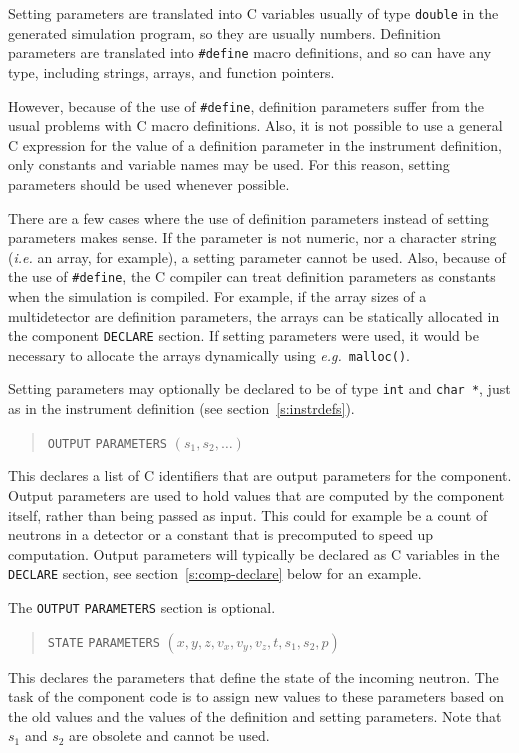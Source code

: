 Setting parameters are translated into C variables usually of type
\verb+double+ in the generated simulation program, so they are usually
numbers. Definition parameters are translated into \verb+#define+ macro
definitions, and so can have any type, including strings, arrays, and
function pointers.

However, because of the use of \verb+#define+, definition parameters
suffer from the usual problems with C macro definitions. Also, it is not
possible to use a general C expression for the value of a definition
parameter in the instrument definition, only constants and variable
names may be used. For this reason, setting parameters should be used
whenever possible.

There are a few cases where the use of definition parameters instead of
setting parameters makes sense. If the parameter is not numeric, nor a character string ({\em i.e.} an
array, for example), a setting parameter cannot be
used. Also, because of the use of \verb+#define+, the C compiler can
treat definition parameters as constants when the simulation is
compiled. For example, if the array sizes of a multidetector are
definition parameters, the arrays can be statically allocated in the
component \verb+DECLARE+ section. If setting parameters were used, it
would be necessary to allocate the arrays dynamically using {\em e.g.}\ 
\verb+malloc()+.

Setting parameters may optionally be declared to be of type \verb+int+ and \verb+char *+, just as in the instrument definition (see section~\ref{s:instrdefs}).

\begin{quote}
  \texttt{OUTPUT} \texttt{PARAMETERS} $(s_1, s_2, \ldots)$
\end{quote}
This declares a list of C identifiers that are output parameters for the
component. Output parameters are used to hold values that are computed
by the component itself, rather than being passed as input. This could
for example be a count of neutrons in a detector or a constant that is
precomputed to speed up computation. Output
parameters will typically be declared as C variables in the
\texttt{DECLARE} section, see section~\ref{s:comp-declare} below for an
example.

The \texttt{OUTPUT} \texttt{PARAMETERS} section is optional.

\begin{quote}
  \texttt{STATE} \texttt{PARAMETERS} $(x,y,z,v_x,v_y,v_z,t,s_1,s_2,p)$
\end{quote}
This declares the parameters that define the state of the incoming
neutron. The task of the component code is to assign new values to these
parameters based on the old values and the values of the definition and
setting parameters. Note that $s_1$ and $s_2$ are obsolete and cannot be used.

